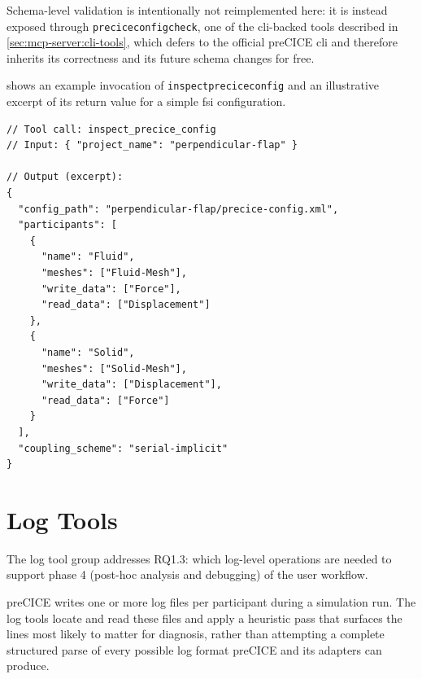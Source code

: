 \documentclass[
  numbers=noenddot,
  english,
  a4paper,
  twoside,
  bibliography=totoc,
  headsepline,
  cleardoublepage=empty,
  parskip=half,
  draft=false
]{scrbook}
\theoremstyle{break}
\renewcommand{\_}{\textunderscore\allowbreak}
\begin{document}
Schema-level validation is intentionally not reimplemented here: it is instead exposed through
\texttt{precice\_config\_check}, one of the \gls{cli}-backed tools described in
\cref{sec:mcp-server:cli-tools}, which defers to the official preCICE \gls{cli} and therefore
inherits its correctness and its future schema changes for free.

 shows an example invocation of \texttt{inspect\_precice\_config}
and an illustrative excerpt of its return value for a simple \gls{fsi} configuration.

\begin{listing}[htbp]
\begin{verbatim}
// Tool call: inspect_precice_config
// Input: { "project_name": "perpendicular-flap" }

// Output (excerpt):
{
  "config_path": "perpendicular-flap/precice-config.xml",
  "participants": [
    {
      "name": "Fluid",
      "meshes": ["Fluid-Mesh"],
      "write_data": ["Force"],
      "read_data": ["Displacement"]
    },
    {
      "name": "Solid",
      "meshes": ["Solid-Mesh"],
      "write_data": ["Displacement"],
      "read_data": ["Force"]
    }
  ],
  "coupling_scheme": "serial-implicit"
}
\end{verbatim}
\caption{Illustrative output of the \texttt{inspect\_precice\_config} configuration tool for a
         \gls{fsi} configuration with two participants.}
\label{lst:config-tool-example}
\end{listing}

\FloatBarrier

\section{Log Tools}\label{sec:mcp-server:log-tools}

The log tool group addresses RQ1.3: which log-level operations are needed to support phase 4
(post-hoc analysis and debugging) of the user workflow.

preCICE writes one or more log files per participant during a simulation run.
The log tools locate and read these files and apply a heuristic pass that surfaces the lines
most likely to matter for diagnosis, rather than attempting a complete structured parse of
every possible log format preCICE and its adapters can produce.
\end{document}
